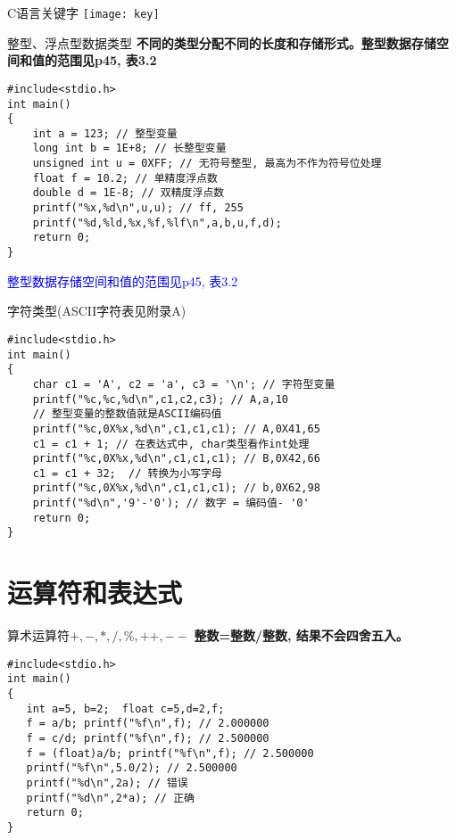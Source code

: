 \begin{frame}{C语言关键字}
\texttt{[image: key]}
\end{frame}

\begin{frame}[fragile]{整型、浮点型数据类型}
\textbf{不同的类型分配不同的长度和存储形式。整型数据存储空间和值的范围见p45, 表3.2}
\begin{lstlisting}
#include<stdio.h>           
int main()                   
{                            
    int a = 123; // 整型变量
    long int b = 1E+8; // 长整型变量
    unsigned int u = 0XFF; // 无符号整型, 最高为不作为符号位处理
    float f = 10.2; // 单精度浮点数
    double d = 1E-8; // 双精度浮点数
    printf("%x,%d\n",u,u); // ff, 255
    printf("%d,%ld,%x,%f,%lf\n",a,b,u,f,d);
    return 0;           
}                            
\end{lstlisting}
\textcolor{blue}{整型数据存储空间和值的范围见p45, 表3.2}
\end{frame}

\begin{frame}[fragile]{字符类型(ASCII字符表见附录A)}
\begin{lstlisting}
#include<stdio.h>           
int main()                   
{                            
    char c1 = 'A', c2 = 'a', c3 = '\n'; // 字符型变量
    printf("%c,%c,%d\n",c1,c2,c3); // A,a,10
    // 整型变量的整数值就是ASCII编码值
    printf("%c,0X%x,%d\n",c1,c1,c1); // A,0X41,65
    c1 = c1 + 1; // 在表达式中, char类型看作int处理
    printf("%c,0X%x,%d\n",c1,c1,c1); // B,0X42,66
    c1 = c1 + 32;  // 转换为小写字母
    printf("%c,0X%x,%d\n",c1,c1,c1); // b,0X62,98
    printf("%d\n",'9'-'0'); // 数字 = 编码值- '0'
    return 0;           
}                            
\end{lstlisting}
\end{frame}

\section{运算符和表达式}

\begin{frame}[fragile]{算术运算符$+, -, *, /, \%, ++, --$}
\textbf{整数=整数/整数, 结果不会四舍五入。}
\begin{lstlisting}
#include<stdio.h>           
int main()                   
{                            
   int a=5, b=2;  float c=5,d=2,f;
   f = a/b; printf("%f\n",f); // 2.000000
   f = c/d; printf("%f\n",f); // 2.500000
   f = (float)a/b; printf("%f\n",f); // 2.500000
   printf("%f\n",5.0/2); // 2.500000
   printf("%d\n",2a); // 错误
   printf("%d\n",2*a); // 正确
   return 0;           
}                            
\end{lstlisting}
\end{frame}

